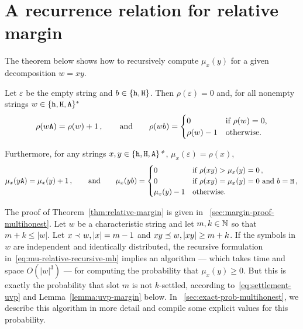 

\section{A recurrence relation for relative margin}\label{sec:margin-recurrence}
The theorem below shows how to recursively compute $\mu_x(y)$ 
for a given decomposition $w = xy$.


\begin{theorem}\label{thm:relative-margin}
  Let $\varepsilon$ be the empty string 
  and $b \in \{\mathtt{h}, \mathtt{H}\}$. 
  Then $\rho(\varepsilon) = 0$ 
  and, for all nonempty strings $w \in \{\mathtt{h}, \mathtt{H}, \mathtt{A}\}^*$ 
  \begin{equation}
    \rho(w\mathtt{A}) = \rho(w) + 1\,, \qquad\text{and}\qquad
    \rho(wb) = \begin{cases} 0 & \text{if $\rho(w) = 0$,}\\
      \rho(w)-1 & \text{otherwise.}
    \end{cases}
    \label{eq:rho-recursive-mh}
  \end{equation}


  Furthermore, for any strings $x, y \in\{\mathtt{h}, \mathtt{H}, \mathtt{A}\}\text{\emph{*}}$,
  $\mu_x(\varepsilon) =\rho(x)$, 
  \begin{equation}
    \mu_x(y\mathtt{A})= \mu_x(y)+1\,,\qquad\text{and}\qquad
    \mu_x(yb)= \begin{cases}
      0 & \text{if $\rho(xy) > \mu_x(y)=0$}\,, \\
      0 & \text{if $\rho(xy) = \mu_x(y) = 0$ and $b = \mathtt{H}$}\,, \\
      \mu_x(y)-1 & \text{otherwise.}
    \end{cases}
    \label{eq:mu-relative-recursive-mh}
  \end{equation}  
\end{theorem}

The proof of Theorem~\ref{thm:relative-margin} is given in \Section~\ref{sec:margin-proof-multihonest}. 
Let $w$ be a characteristic string and 
let $m, k \in \mathbb{N}$ so that $m + k \leq |w|$. 
Let $x \prec w, |x| = m-1$ and $xy \preceq w, |xy| \geq m + k$.
If the symbols in $w$ are independent and identically distributed, 
the recursive formulation in~\eqref{eq:mu-relative-recursive-mh} implies an algorithm --- which takes time and space $O(|w|^3)$ --- 
for computing the probability that $\mu_x(y) \geq 0$. 
But this is exactly the probability that slot $m$ is not $k$-settled, 
according to~\eqref{eq:settlement-uvp} 
and Lemma~\ref{lemma:uvp-margin} below. 
In \Section~\ref{sec:exact-prob-multihonest}, 
we describe this algorithm in more detail and 
compile some explicit values for this probability.


